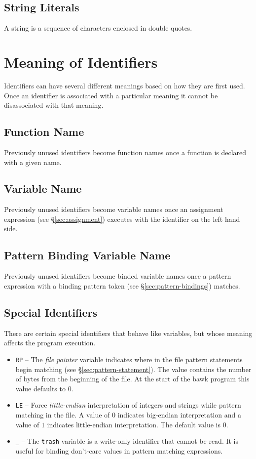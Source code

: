 \subsection{String Literals}
\label{sec:strings}
A string is a sequence of characters enclosed in double quotes.

\section{Meaning of Identifiers}
Identifiers can have several different meanings based on how they are first used.  Once an identifier is associated with a particular meaning it cannot be disassociated with that meaning.

\subsection{Function Name}
Previously unused identifiers become function names once a function is declared with a given name.

\subsection{Variable Name}
\label{sec:variables}
Previously unused identifiers become variable names once an assignment expression (see \S\ref{sec:assignment}) executes with the identifier on the left hand side.

\subsection{Pattern Binding Variable Name}
\label{sec:bind-variables}
Previously unused identifiers become binded variable names once a pattern expression with a binding pattern token (see \S\ref{sec:pattern-bindings}) matches.

\subsection{Special Identifiers}
There are certain special identifiers that behave like variables, but whose meaning affects the program execution.
\begin{itemize}
\item \texttt{RP} -- The \textsl{file pointer} variable  indicates where in the file pattern statements begin matching (see \S\ref{sec:pattern-statement}).  The value contains the number of bytes from the beginning of the file.  At the start of the bawk program this value defaults to $0$.
\item \texttt{LE} -- Force \textsl{little-endian} interpretation of integers and strings while pattern matching in the file.  A value of $0$ indicates big-endian interpretation and a value of $1$ indicates little-endian interpretation.  The default value is $0$.
\item \texttt{\_} -- The \texttt{trash} variable is a write-only identifier that cannot be read.  It is useful for binding don't-care values in pattern matching expressions.
\end{itemize}

